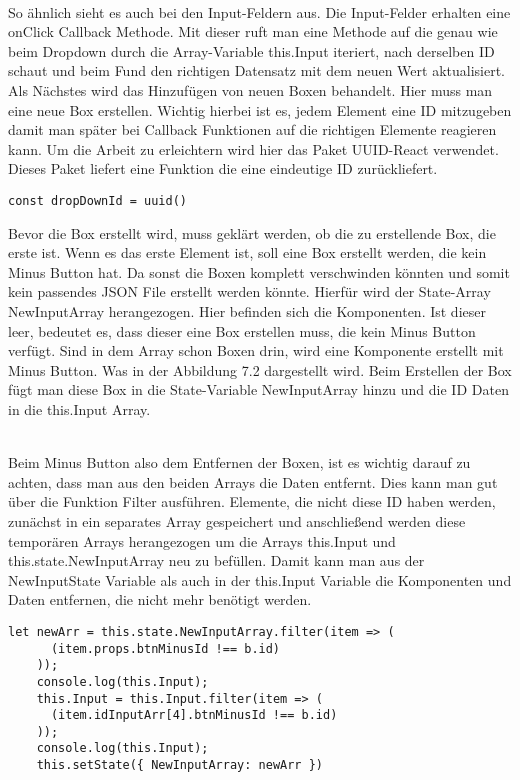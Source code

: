 \documentclass[a4paper,11pt]{scrreprt}
\begin{document}
\\
So ähnlich sieht es auch bei den Input-Feldern aus. Die Input-Felder erhalten eine onClick Callback Methode. Mit dieser ruft man eine Methode auf die genau wie beim Dropdown durch die Array-Variable this.Input iteriert, nach derselben ID schaut und beim Fund den richtigen Datensatz mit dem neuen Wert aktualisiert. 
\\
Als Nächstes wird das Hinzufügen von neuen Boxen behandelt. Hier muss man eine neue Box erstellen. Wichtig hierbei ist es, jedem Element eine ID mitzugeben damit man später bei Callback Funktionen auf die richtigen Elemente reagieren kann. Um die Arbeit zu erleichtern wird hier das Paket UUID-React verwendet. Dieses Paket liefert eine Funktion die eine eindeutige ID zurückliefert. 
\begin{lstlisting}
const dropDownId = uuid()
\end{lstlisting}
Bevor die Box erstellt wird, muss geklärt werden, ob die zu erstellende Box, die erste ist. 
Wenn es das erste Element ist, soll eine Box erstellt werden, die kein Minus Button hat.
Da sonst die Boxen komplett verschwinden könnten und somit kein passendes JSON File erstellt werden könnte.  Hierfür wird der State-Array NewInputArray herangezogen. Hier befinden sich die Komponenten. Ist dieser leer, bedeutet es, dass dieser eine Box erstellen muss, die kein Minus Button verfügt. Sind in dem Array schon Boxen drin, wird eine Komponente erstellt mit Minus Button. Was in der Abbildung 7.2 dargestellt wird.  
Beim Erstellen der Box fügt man diese Box in die State-Variable NewInputArray hinzu und die ID Daten in die this.Input Array.
 
\\
Beim Minus Button also dem Entfernen der Boxen, ist es wichtig darauf zu achten, dass man aus den beiden Arrays die Daten entfernt. Dies kann man gut über die Funktion Filter ausführen. Elemente, die nicht diese ID haben werden, zunächst in ein separates Array gespeichert und anschließend werden diese temporären Arrays herangezogen um die Arrays this.Input und this.state.NewInputArray neu zu befüllen.
Damit kann man aus der NewInputState Variable als auch in der this.Input Variable die Komponenten und Daten entfernen, die nicht mehr benötigt werden.
\hfill \break
\hfill \break
\hfill \break
\hfill \break
\begin{lstlisting}
let newArr = this.state.NewInputArray.filter(item => (
      (item.props.btnMinusId !== b.id)
    ));
    console.log(this.Input);
    this.Input = this.Input.filter(item => (
      (item.idInputArr[4].btnMinusId !== b.id)
    ));
    console.log(this.Input);
    this.setState({ NewInputArray: newArr })
\end{lstlisting}
\end{document}
